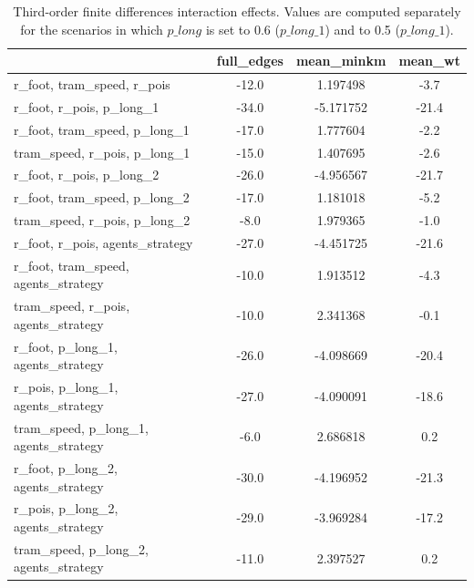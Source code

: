\begin{table}[H]
    \raggedright
    \scriptsize{
\begin{tabular}{lccc}
\toprule
{} &  full\_edges &  mean\_minkm &  mean\_wt \\
\midrule
r\_foot, tram\_speed, r\_pois            &       -12.0 &    1.197498 &                  -3.7 \\
r\_foot, r\_pois, p\_long\_1              &       -34.0 &   -5.171752 &                 -21.4 \\
r\_foot, tram\_speed, p\_long\_1          &       -17.0 &    1.777604 &                  -2.2 \\
tram\_speed, r\_pois, p\_long\_1          &       -15.0 &    1.407695 &                  -2.6 \\
r\_foot, r\_pois, p\_long\_2              &       -26.0 &   -4.956567 &                 -21.7 \\
r\_foot, tram\_speed, p\_long\_2          &       -17.0 &    1.181018 &                  -5.2 \\
tram\_speed, r\_pois, p\_long\_2          &        -8.0 &    1.979365 &                  -1.0 \\
r\_foot, r\_pois, agents\_strategy       &       -27.0 &   -4.451725 &                 -21.6 \\
r\_foot, tram\_speed, agents\_strategy   &       -10.0 &    1.913512 &                  -4.3 \\
tram\_speed, r\_pois, agents\_strategy   &       -10.0 &    2.341368 &                  -0.1 \\
r\_foot, p\_long\_1, agents\_strategy     &       -26.0 &   -4.098669 &                 -20.4 \\
r\_pois, p\_long\_1, agents\_strategy     &       -27.0 &   -4.090091 &                 -18.6 \\
tram\_speed, p\_long\_1, agents\_strategy &        -6.0 &    2.686818 &                   0.2 \\
r\_foot, p\_long\_2, agents\_strategy     &       -30.0 &   -4.196952 &                 -21.3 \\
r\_pois, p\_long\_2, agents\_strategy     &       -29.0 &   -3.969284 &                 -17.2 \\
tram\_speed, p\_long\_2, agents\_strategy &       -11.0 &    2.397527 &                   0.2 \\
\bottomrule
\end{tabular}}
    \caption{Third-order finite differences interaction effects. Values are computed separately for the scenarios in which $p\_long$ is set to 0.6 ($p\_long\_1$) and to 0.5 ($p\_long\_1$).}
    \label{tab:triplets}
\end{table}

